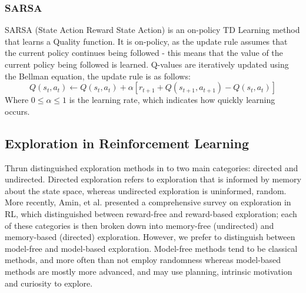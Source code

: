\subsubsection{SARSA}
SARSA (State Action Reward State Action) \cite{rummery:cuedtr94} is an on-policy TD Learning method that learns a Quality function. It is on-policy, as the update rule assumes that the current policy continues being followed - this means that the value of the current policy being followed is learned. Q-values are iteratively updated using the Bellman equation, the update rule is as follows:
\begin{equation}
\label{eqn:sarsaupdate}
Q(s_t, a_t) \leftarrow Q(s_t, a_t) + \alpha[r_{t+1} + Q(s_{t+1}, a_{t+1})-Q(s_t, a_t)]
\end{equation}
Where $0 \le \alpha \le 1$ is the learning rate, which indicates how quickly learning occurs.
\subsection{Exploration in Reinforcement Learning}
Thrun \cite{Thrun-1992-15850} distinguished exploration methods in to two main categories: directed and undirected. Directed exploration refers to exploration that is informed by memory about the state space, whereas undirected exploration is uninformed, random. More recently, Amin, et al. \cite{DBLP:journals/corr/abs-2109-00157} presented a comprehensive survey on exploration in RL, which distinguished between reward-free and reward-based exploration; each of these categories is then broken down into memory-free (undirected) and memory-based (directed) exploration. However, we prefer to distinguish between model-free and model-based exploration. Model-free methods tend to be classical methods, and more often than not employ randomness whereas model-based methods are mostly more advanced, and may use planning, intrinsic motivation and curiosity to explore.
